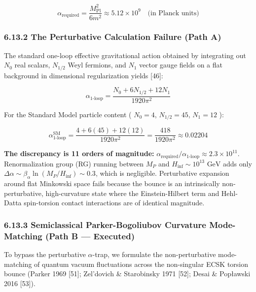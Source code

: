 \documentclass[11pt,a4paper]{article}
\theoremstyle{definition}
\theoremstyle{remark}
\begin{document}
\begin{equation}
\alpha_{\text{required}} = \frac{M_{\text{Pl}}^2}{6 m^2} \approx 5.12 \times 10^9 \quad \text{(in Planck units)}
\end{equation}


\subsubsection{6.13.2 The Perturbative Calculation Failure (Path A)}

The standard one-loop effective gravitational action obtained by integrating out $N_0$ real scalars, $N_{1/2}$ Weyl fermions, and $N_1$ vector gauge fields on a flat background in dimensional regularization yields [46]:


\begin{equation}
\alpha_{\text{1-loop}} = \frac{N_0 + 6N_{1/2} + 12N_1}{1920\pi^2}
\end{equation}


For the Standard Model particle content ( $N_0 = 4$, $N_{1/2} = 45$, $N_1 = 12$ ):


\begin{equation}
\alpha_{\text{1-loop}}^{\text{SM}} = \frac{4 + 6(45) + 12(12)}{1920\pi^2} = \frac{418}{1920\pi^2} \approx 0.02204
\end{equation}


\textbf{The discrepancy is 11 orders of magnitude:} $\alpha_{\text{required}} / \alpha_{\text{1-loop}} \approx 2.3 \times 10^{11}$. Renormalization group (RG) running between $M_P$ and $H_{\text{inf}} \sim 10^{13}\text{ GeV}$ adds only $\Delta\alpha \sim \beta_\alpha \ln(M_P / H_{\text{inf}}) \sim 0.3$, which is negligible. Perturbative expansion around flat Minkowski space fails because the bounce is an intrinsically non-perturbative, high-curvature state where the Einstein-Hilbert term and Hehl-Datta spin-torsion contact interactions are of identical magnitude.

\subsubsection{6.13.3 Semiclassical Parker-Bogoliubov Curvature Mode-Matching (Path B — Executed)}

To bypass the perturbative $\alpha$-trap, we formulate the non-perturbative mode-matching of quantum vacuum fluctuations across the non-singular ECSK torsion bounce (Parker 1969 [51]; Zel'dovich \& Starobinsky 1971 [52]; Desai \& Popławski 2016 [53]).
\end{document}
